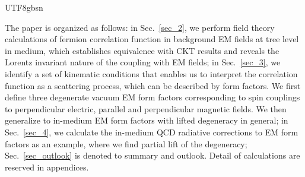 \documentclass[11pt]{article}\def\baselinestretch{1.4}
\begin{document}
\begin{CJK}{UTF8}{gbsn}



The paper is organized as follows: in Sec.~\ref{sec_2}, we perform field theory calculations of fermion correlation function in background EM fields at tree level in medium, which establishes equivalence with CKT results and reveals the Lorentz invariant nature of the coupling with EM fields; in Sec.~\ref{sec_3}, we identify a set of kinematic conditions that enables us to interpret the correlation function as a scattering process, which can be described by form factors. We first define three degenerate vacuum EM form factors corresponding to spin couplings to perpendicular electric, parallel and perpendicular magnetic fields. We then generalize to in-medium EM form factors with lifted degeneracy in general; in Sec.~\ref{sec_4}, we calculate the in-medium QCD radiative corrections to EM form factors as an example, where we find partial lift of the degeneracy; Sec.~\ref{sec_outlook} is denoted to summary and outlook. Detail of calculations are reserved in appendices.



\end{CJK}
\end{document}

